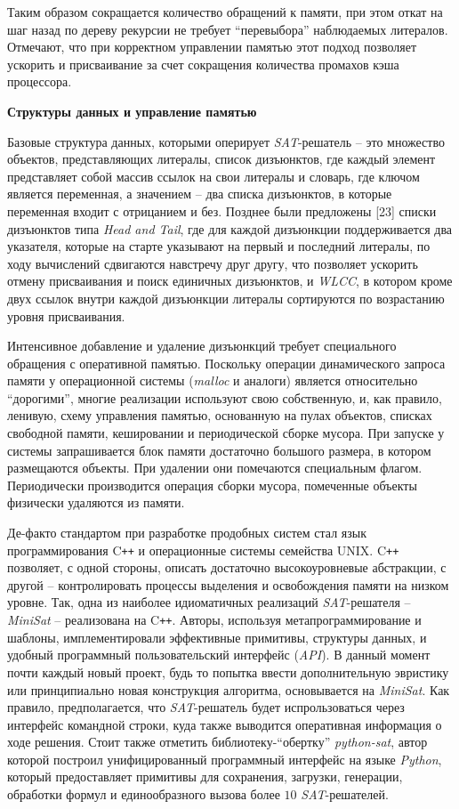 Таким образом сокращается количество обращений к памяти, при этом откат на шаг назад по дереву рекурсии не требует \enquote{перевыбора} наблюдаемых литералов. Отмечают, что при корректном управлении памятью этот подход позволяет ускорить и присваивание за счет сокращения количества промахов кэша процессора.

\textbf{Структуры данных и управление памятью}

Базовые структура данных, которыми оперирует \textit{SAT}-решатель – это множество объектов, представляющих литералы, список дизъюнктов, где каждый элемент представляет собой массив ссылок на свои литералы и словарь, где ключом является переменная, а значением – два списка дизъюнктов, в которые переменная входит с отрицанием и без. Позднее были предложены [23] списки дизъюнктов типа \textit{Head and Tail}, где для каждой дизъюнкции поддерживается два указателя, которые на старте указывают на первый и последний литералы, по ходу вычислений сдвигаются навстречу друг другу, что позволяет ускорить отмену присваивания и поиск единичных дизъюнктов, и \textit{WLCC}, в котором кроме двух ссылок внутри каждой дизъюнкции литералы сортируются по возрастанию уровня присваивания.

Интенсивное добавление и удаление дизъюнкций требует специального обращения с оперативной памятью. Поскольку операции динамического запроса памяти у операционной системы (\textit{malloc} и аналоги) является относительно \enquote{дорогими}, многие реализации используют свою собственную, и, как правило, ленивую, схему управления памятью, основанную на пулах объектов, списках свободной памяти, кешировании и периодической сборке мусора. При запуске у системы запрашивается блок памяти достаточно большого размера, в котором размещаются объекты. При удалении они помечаются специальным флагом. Периодически производится операция сборки мусора, помеченные объекты физически удаляются из памяти.

Де-факто стандартом при разработке продобных систем стал язык программирования C\texttt{++} и операционные системы семейства UNIX.
C\texttt{++} позволяет, с одной стороны, описать достаточно высокоуровневые абстракции, с другой – контролировать процессы выделения и освобождения памяти на низком уровне. Так, одна из наиболее идиоматичных реализаций \textit{SAT}-решателя – \textit{MiniSat} – реализована на C\texttt{++}. Авторы, используя метапрограммирование и шаблоны, имплементировали эффективные примитивы, структуры данных, и удобный программный пользовательский интерфейс (\textit{API}). В данный момент почти каждый новый проект, будь то попытка ввести дополнительную эвристику или принципиально новая конструкция алгоритма, основывается на \textit{MiniSat}. Как правило, предполагается, что \textit{SAT}-решатель будет испрользоваться через интерфейс командной строки, куда также выводится оперативная информация о ходе решения. Стоит также отметить библиотеку-\enquote{обертку} \textit{python-sat}, автор которой построил унифицированный программный интерфейс на языке \textit{Python}, который предоставляет примитивы для сохранения, загрузки, генерации, обработки формул и единообразного вызова более $10$ \textit{SAT}-решателей.

